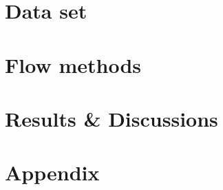 \documentclass[12pt]{article}
\begin{document}
{\section{Data set}

%


\FloatBarrier
\section{Flow methods}


\FloatBarrier
\section{Results \& Discussions}


\FloatBarrier
\section{Appendix}


\newpage




}
\end{document}
